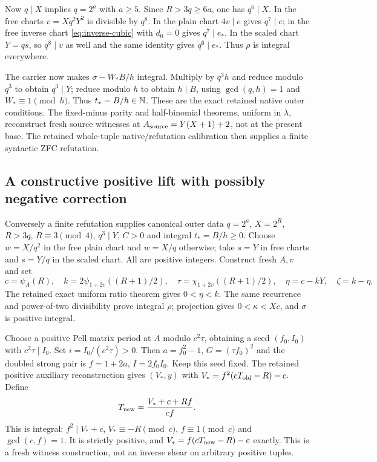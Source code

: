 Now $q\mid X$ implies $q=2^a$ with $a\ge5$.
Since $R>3q\ge6a$, one has $q^6\mid X$.
In the free charts $v=Xq^2Y^2$ is divisible by $q^8$.
In the plain chart $4v\mid e$ gives $q^7\mid e$; in the free
inverse chart \eqref{eq:inverse-cubic} with $d_0=0$ gives $q^7\mid e_*$.
In the scaled chart $Y=qs$, so $q^8\mid v$ as well and the same
identity gives $q^6\mid e_*$. Thus $\rho$ is integral everywhere.

The carrier now makes $\sigma-W_*B/h$ integral. Multiply by $q^3h$
and reduce modulo $q^3$ to obtain $q^3\mid Y$; reduce modulo $h$
to obtain $h\mid B$, using $\gcd(q,h)=1$ and $W_*\equiv1\pmod h$.
Thus $t_*=B/h\in\mathbb N$. These are the exact retained native outer
conditions. The fixed-minus parity and half-binomial theorems, uniform
in $\lambda$, reconstruct fresh source witnesses at
$A_{\rm source}=Y(X+1)+2$, not at the present base.
The retained whole-tuple native/refutation calibration then supplies a
finite syntactic ZFC refutation.

\subsection{A constructive positive lift with possibly negative correction}
Conversely a finite refutation supplies canonical outer data
$q=2^a$, $X=2^R$, $R>3q$, $R\equiv3\pmod4$, $q^3\mid Y$,
$C>0$ and integral $t_*=B/h\ge0$. Choose $w=X/q^2$ in the free
plain chart and $w=X/q$ otherwise; take $s=Y$ in free charts and
$s=Y/q$ in the scaled chart. All are positive integers.
Construct fresh $A,v$ and set
\[
 c=\psi_A(R),\quad k=2\psi_{1+2v}((R+1)/2),\quad
 \tau=\chi_{1+2v}((R+1)/2),
 \quad\eta=c-kY,\quad\zeta=k-\eta.
\]
The retained exact uniform ratio theorem gives $0<\eta<k$.
The same recurrence and power-of-two divisibility prove integral
$\rho$; projection gives $0<\kappa<Xc$, and $\sigma$ is positive
integral.

Choose a positive Pell matrix period at $A$ modulo $c^2\tau$,
obtaining a seed $(f_0,I_0)$ with $c^2\tau\mid I_0$.
Set $i=I_0/(c^2\tau)>0$. Then $a=f_0^2-1$, $G=(\tau f_0)^2$
and the doubled strong pair is $f=1+2a$, $I=2f_0I_0$.
Keep this seed fixed. The retained positive auxiliary reconstruction
gives $(V_*,y)$ with $V_*=f^2(cT_{\rm old}-R)-c$.
Define
\[
 T_{\rm new}=\frac{V_*+c+Rf}{cf}.
\]
This is integral: $f^2\mid V_*+c$, $V_*\equiv-R\pmod c$,
$f\equiv1\pmod c$ and $\gcd(c,f)=1$. It is strictly positive,
and $V_*=f(cT_{\rm new}-R)-c$ exactly. This is a fresh witness
construction, not an inverse shear on arbitrary positive tuples.

